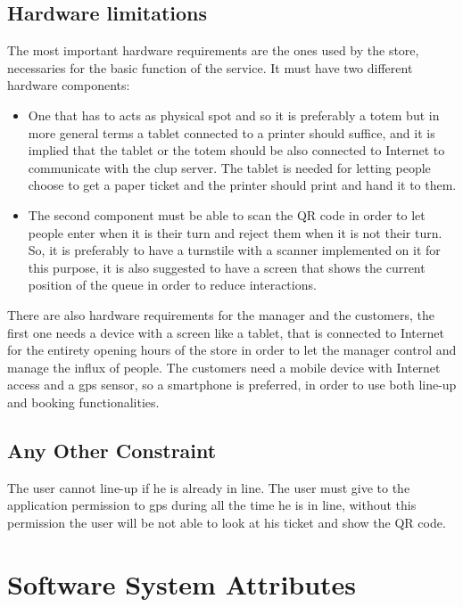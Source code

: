 \subsection{Hardware limitations}

The most important hardware requirements are the ones used by the store, necessaries for the basic function of the service. It must have two different hardware components:
\begin{itemize}
    \item One that has to acts as physical spot and so it is preferably a totem but in more general terms a tablet connected to a printer should suffice, and it is implied that the tablet or the totem should be also connected to Internet to communicate with the \gls{clup} server. The tablet is needed for letting people choose to get a paper ticket and the printer should print and hand it to them.

    \item The second component must be able to scan the QR code in order to let people enter when it is their turn and reject them when it is not their turn. So, it is preferably to have a turnstile with a scanner implemented on it for this purpose, it is also suggested to have a screen that shows the current position of the queue in order to reduce interactions.

\end{itemize}

There are also hardware requirements for the manager and the customers, the first one needs a device with a screen like a tablet, that is connected to Internet for the entirety opening hours of the store in order to let the manager control and manage the influx of people. The customers need a mobile device with Internet access and a \gls{gps} sensor, so a smartphone is preferred, in order to use both line-up and booking functionalities.

\subsection{Any Other Constraint}

The user cannot line-up if he is already in line.
The user must give to the application permission to \gls{gps} during all the time he is in line, without this permission the user will be not able to look at his ticket and show the QR code.


\section{Software System Attributes}

